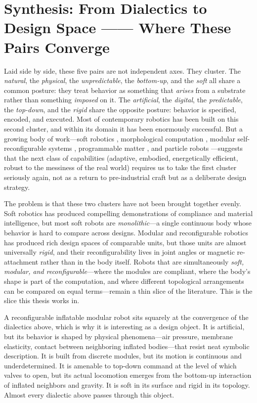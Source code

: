 \section{Synthesis: From Dialectics to Design Space —— Where These Pairs Converge}
\label{sec:synthesis}

Laid side by side, these five pairs are not independent axes. They cluster. The \textit{natural}, the \textit{physical}, the \textit{unpredictable}, the \textit{bottom-up}, and the \textit{soft} all share a common posture: they treat behavior as something that \textit{arises} from a substrate rather than something \textit{imposed} on it. The \textit{artificial}, the \textit{digital}, the \textit{predictable}, the \textit{top-down}, and the \textit{rigid} share the opposite posture: behavior is specified, encoded, and executed. Most of contemporary robotics has been built on this second cluster, and within its domain it has been enormously successful. But a growing body of work---soft robotics \cite{rus2015design}, morphological computation \cite{pfeifer2005new}, modular self-reconfigurable systems \cite{yim2007modular}, programmable matter \cite{cademartiri2015programmable}, and particle robots \cite{li2019particle}---suggests that the next class of capabilities (adaptive, embodied, energetically efficient, robust to the messiness of the real world) requires us to take the first cluster seriously again, not as a return to pre-industrial craft but as a deliberate design strategy.

The problem is that these two clusters have not been brought together evenly. Soft robotics has produced compelling demonstrations of compliance and material intelligence, but most soft robots are \textit{monolithic}---a single continuous body whose behavior is hard to compare across designs. Modular and reconfigurable robotics has produced rich design spaces of comparable units, but those units are almost universally \textit{rigid}, and their reconfigurability lives in joint angles or magnetic re-attachment rather than in the body itself. Robots that are simultaneously \textit{soft, modular, and reconfigurable}---where the modules are compliant, where the body's shape is part of the computation, and where different topological arrangements can be compared on equal terms---remain a thin slice of the literature. This is the slice this thesis works in.

A reconfigurable inflatable modular robot sits squarely at the convergence of the dialectics above, which is why it is interesting as a design object. It is artificial, but its behavior is shaped by physical phenomena---air pressure, membrane elasticity, contact between neighboring inflated bodies---that resist neat symbolic description. It is built from discrete modules, but its motion is continuous and underdetermined. It is amenable to top-down command at the level of which valves to open, but its actual locomotion emerges from the bottom-up interaction of inflated neighbors and gravity. It is soft in its surface and rigid in its topology. Almost every dialectic above passes through this object.

